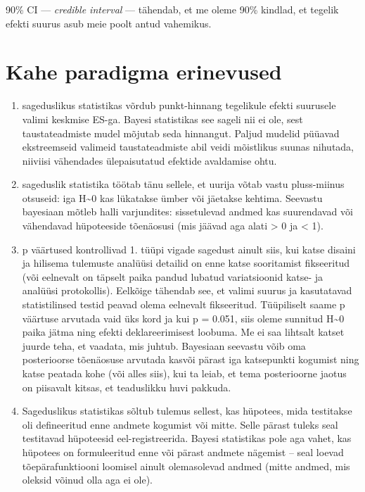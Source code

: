 \documentclass[]{book}
\begin{document}
90\% CI --- \emph{credible interval} --- tähendab, et me oleme 90\% kindlad, et tegelik efekti suurus asub meie poolt antud vahemikus.

\hypertarget{kahe-paradigma-erinevused-1}{%
\section*{Kahe paradigma erinevused}\label{kahe-paradigma-erinevused-1}}

\begin{enumerate}
\def\labelenumi{\arabic{enumi}.}
\item
  sageduslikus statistikas võrdub punkt-hinnang tegelikule efekti suurusele valimi keskmise ES-ga. Bayesi statistikas see sageli nii ei ole, sest taustateadmiste mudel mõjutab seda hinnangut. Paljud mudelid püüavad ekstreemseid valimeid taustateadmiste abil veidi mõistlikus suunas nihutada, niiviisi vähendades ülepaisutatud efektide avaldamise ohtu.
\item
  sageduslik statistika töötab tänu sellele, et uurija võtab vastu pluss-miinus otsuseid: iga H\textasciitilde{}0 kas lükatakse ümber või jäetakse kehtima. Seevastu bayesiaan mõtleb halli varjundites: sissetulevad andmed kas suurendavad või vähendavad hüpoteeside tõenäosusi (mis jäävad aga alati \textgreater{} 0 ja \textless{} 1).
\item
  p väärtused kontrollivad 1. tüüpi vigade sagedust ainult siis, kui katse disaini ja hilisema tulemuste analüüsi detailid on enne katse sooritamist fikseeritud (või eelnevalt on täpselt paika pandud lubatud variatsioonid katse- ja analüüsi protokollis). Eelkõige tähendab see, et valimi suurus ja kasutatavad statistilinsed testid peavad olema eelnevalt fikseeritud. Tüüpiliselt saame p väärtuse arvutada vaid üks kord ja kui p = 0.051, siis oleme sunnitud H\textasciitilde{}0 paika jätma ning efekti deklareerimisest loobuma. Me ei saa lihtsalt katset juurde teha, et vaadata, mis juhtub. Bayesiaan seevastu võib oma posterioorse tõenäosuse arvutada kasvõi pärast iga katsepunkti kogumist ning katse peatada kohe (või alles siis), kui ta leiab, et tema posterioorne jaotus on piisavalt kitsas, et teaduslikku huvi pakkuda.
\item
  Sageduslikus statistikas sõltub tulemus sellest, kas hüpotees, mida testitakse oli defineeritud enne andmete kogumist või mitte. Selle pärast tuleks seal testitavad hüpoteesid eel-registreerida. Bayesi statistikas pole aga vahet, kas hüpotees on formuleeritud enne või pärast andmete nägemist -- seal loevad tõepärafunktiooni loomisel ainult olemasolevad andmed (mitte andmed, mis oleksid võinud olla aga ei ole).

\end{enumerate}
\end{document}

